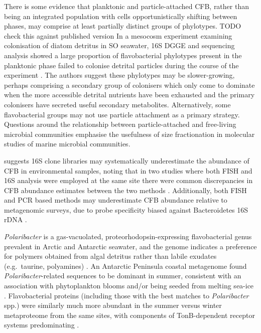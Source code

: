 There is some evidence that planktonic and particle-attached \ac{CFB}, rather than being an integrated population with cells opportunistically shifting between phases, may comprise at least partially distinct groups of phylotypes.
TODO check this against published version
In a mesocosm experiment examining colonisation of diatom detritus in \ac{SO} seawater, 16S \ac{DGGE} and sequencing analysis showed a large proportion of flavobacterial phylotypes present in the planktonic phase failed to colonise detrital particles during the course of the experiment \cite{Abell:dh}.
The authors suggest these phylotypes may be slower-growing, perhaps comprising a secondary group of colonisers which only come to dominate when the more accessible detrital nutrients have been exhausted and the primary colonisers have secreted useful secondary metabolites.
Alternatively, some flavobacterial groups may not use particle attachment as a primary strategy.
Questions around the relationship between particle-attached and free-living microbial communities emphasise the usefulness of size fractionation in molecular studies of marine microbial communities.

\citet{Kirchman:2002ub} suggests 16S clone libraries may systematically underestimate the abundance of \ac{CFB} in environmental samples, noting that in two studies where both \ac{FISH} and 16S analysis were employed at the same site there were common discrepancies in \ac{CFB} abundance estimates between the two methods \cite{Cottrell:2000iq,Eilers:2000in}.
Additionally, both \ac{FISH} and PCR based methods may underestimate \ac{CFB} abundance relative to metagenomic surveys, due to probe specificity biased against Bacteroidetes 16S rDNA \cite{Cottrell:2005bo,OSullivan:2006km}.

\emph{Polaribacter} is a gas-vacuolated, proteorhodopsin-expressing flavobacterial genus prevalent in Arctic and Antarctic seawater, and the genome indicates a preference for polymers obtained from algal detritus rather than labile exudates (e.g.\ taurine, polyamines) \cite{Gonzalez:2008tn}.
An Antarctic Peninsula coastal metagenome found \emph{Polaribacter}-related sequences to be dominant in summer, consistent with an association with phytoplankton blooms and/or being seeded from melting sea-ice \cite{Grzymski:2012ej}.
Flavobacterial proteins (including those with the best matches to \emph{Polaribacter} spp.) were similarly much more abundant in the summer versus winter metaproteome from the same sites, with components of TonB-dependent receptor systems predominating \cite{Williams:2012bs}. 

